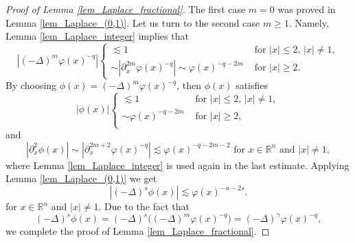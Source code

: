 \documentclass[10pt,a4paper]{amsart}
\begin{document}
\begin{proof}[Proof of Lemma \ref{lem_Laplace_fractional}]
\noindent The first case $m=0$ was proved in Lemma \ref{lem_Laplace_(0,1)}. Let us turn to the second case $m\geq 1$. Namely, Lemma \ref{lem_Laplace_integer} implies that
\[ |(-\Delta)^{m}\varphi(x)^{-q}|
\begin{cases}
    \lesssim 1 &\text{ for }|x|\leq 2,\,|x|\neq 1,\\
    \sim |\partial^{2m}_x\varphi(x)^{-q}|\sim\varphi(x)^{-q-2m} &\text{ for }|x|\geq 2.
\end{cases}
\]
By choosing $\phi(x)=(-\Delta)^{m}\varphi(x)^{-q}$, then $\phi(x)$ satisfies 
\[|\phi(x)|
\begin{cases}
    \lesssim 1&\text{ for }|x|\leq 2,\,|x|\neq 1,\\
    \sim \varphi(x)^{-q-2m}&\text{ for }|x|\geq 2,\\
\end{cases}
\]
and
$$ |\partial^2_x\phi(x)|\sim \left|\partial^{2m+2}_x\varphi(x)^{-q}\right|\lesssim \varphi(x)^{-q-2m-2} \text{ for } x\in \mathbb{R}^n \text{ and }|x|\neq 1, $$
where Lemma \ref{lem_Laplace_integer} is used again in the last estimate. Applying Lemma \ref{lem_Laplace_(0,1)} we get
\[
|(-\Delta)^s\phi(x)|\lesssim \varphi(x)^{-n-2s}.
\]
for $x\in \mathbb{R}^n$ and $|x|\neq 1$. Due to the fact that
$$ (-\Delta)^{s}\phi(x)=(-\Delta)^{s}\big((-\Delta)^{m}\varphi(x)^{-q}\big)=(-\Delta)^{\gamma}\varphi(x)^{-q}, $$
we complete the proof of Lemma \ref{lem_Laplace_fractional}.
\end{proof}
\end{document}

